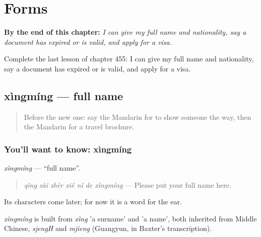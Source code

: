 
\chapter{Forms}
\label{ch:zh-forms}

\begin{chapteropening}
\textbf{By the end of this chapter:} \emph{I can give my full name and nationality, say a document has expired or is valid, and apply for a visa.}

Complete the last lesson of chapter 455: I can give my full name and nationality, say a document has expired or is valid, and apply for a visa.
\end{chapteropening}

\section[xìngmíng]{xìngmíng — full name}

\label{lesson:ZH-C455-xingming}



\begin{quote}
Before the new one: say the Mandarin for to show someone the way, then the Mandarin for a travel brochure.
\end{quote}

\subsection*{You'll want to know: xìngmíng}
\emph{xìngmíng} — \textquotedblleft{}full name\textquotedblright{}.

\begin{quote}
\emph{qǐng zài zhèr xiě nǐ de xìngmíng} — Please put your full name here.
\end{quote}

Its characters come later; for now it is a word for the ear.

\begin{cousinweb}
\emph{xìngmíng} is built from \emph{xìng} 'a surname' and  'a name', both inherited from Middle Chinese, \emph{sjengH} and \emph{mjieng} (Guangyun, in Baxter's transcription).
\end{cousinweb}

